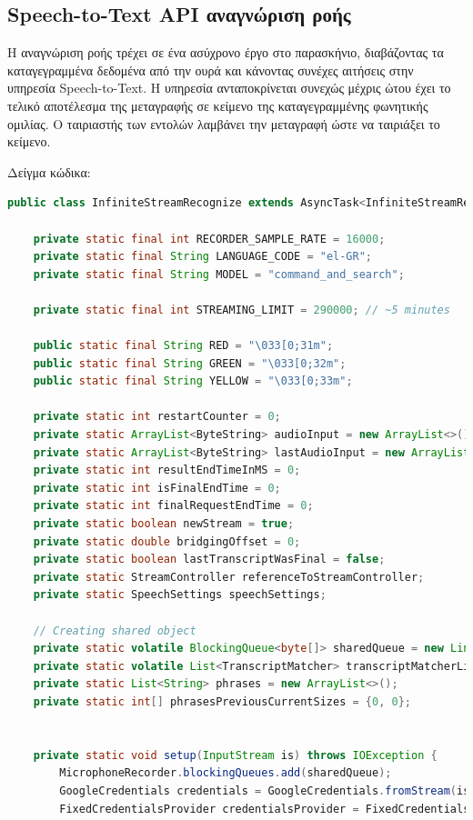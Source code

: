 \documentclass[oneside, 12pt]{book}
\begin{document}
\subsection{Speech-to-Text API αναγνώριση ροής}
Η αναγνώριση ροής τρέχει σε ένα ασύχρονο έργο στο παρασκήνιο, διαβάζοντας τα καταγεγραμμένα δεδομένα από την ουρά και κάνοντας συνέχες αιτήσεις στην υπηρεσία Speech-to-Text. Η υπηρεσία ανταποκρίνεται συνεχώς μέχρις ώτου έχει το τελικό αποτέλεσμα της μεταγραφής σε κείμενο της καταγεγραμμένης φωνητικής ομιλίας. Ο ταιριαστής των εντολών λαμβάνει την μεταγραφή ώστε να ταιριάξει το κείμενο.
\begin{center}
	Δείγμα κώδικα:
	\begin{lstlisting}[language=java]
public class InfiniteStreamRecognize extends AsyncTask<InfiniteStreamRecognizeArguments, Void, Void> {

    private static final int RECORDER_SAMPLE_RATE = 16000;
    private static final String LANGUAGE_CODE = "el-GR";
    private static final String MODEL = "command_and_search";

    private static final int STREAMING_LIMIT = 290000; // ~5 minutes

    public static final String RED = "\033[0;31m";
    public static final String GREEN = "\033[0;32m";
    public static final String YELLOW = "\033[0;33m";

    private static int restartCounter = 0;
    private static ArrayList<ByteString> audioInput = new ArrayList<>();
    private static ArrayList<ByteString> lastAudioInput = new ArrayList<>();
    private static int resultEndTimeInMS = 0;
    private static int isFinalEndTime = 0;
    private static int finalRequestEndTime = 0;
    private static boolean newStream = true;
    private static double bridgingOffset = 0;
    private static boolean lastTranscriptWasFinal = false;
    private static StreamController referenceToStreamController;
    private static SpeechSettings speechSettings;

    // Creating shared object
    private static volatile BlockingQueue<byte[]> sharedQueue = new LinkedBlockingQueue<>();
    private static volatile List<TranscriptMatcher> transcriptMatcherList = new ArrayList<>();
    private static List<String> phrases = new ArrayList<>();
    private static int[] phrasesPreviousCurrentSizes = {0, 0};


    private static void setup(InputStream is) throws IOException {
        MicrophoneRecorder.blockingQueues.add(sharedQueue);
        GoogleCredentials credentials = GoogleCredentials.fromStream(is);
        FixedCredentialsProvider credentialsProvider = FixedCredentialsProvider.create(credentials);


\end{lstlisting}
\end{center}
\end{document}

